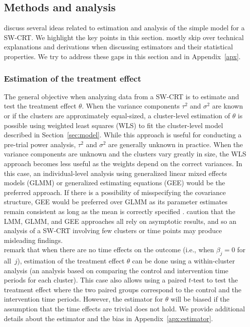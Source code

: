 \documentclass[10pt]{article}
\begin{document}
\subsection{Methods and analysis}

\textcite{Hussey:2007} discuss several ideas related to estimation and analysis of the simple model for a SW-CRT. We highlight the key points in this section. \citeauthor{Hussey:2007} mostly skip over technical explanations and derivations when discussing estimators and their statistical properties. We try to address these gaps in this section and in Appendix~\ref{apx}.

\subsubsection{Estimation of the treatment effect}

The general objective when analyzing data from a SW-CRT is to estimate and test the treatment effect $\theta$. When the variance components $\tau^2$ and $\sigma^2$ are known or if the clusters are approximately equal-sized, a cluster-level estimation of $\theta$ is possible using weighted least squares (WLS) to fit the cluster-level model described in Section~\ref{sec:model}. While this approach is useful for conducting a pre-trial power analysis, $\tau^2$ and $\sigma^2$ are generally unknown in practice. When the variance components are unknown and the clusters vary greatly in size, the WLS approach becomes less useful as the weights depend on the correct variances. In this case, an individual-level analysis using generalized linear mixed effects models (GLMM) or generalized estimating equations (GEE) would be the preferred approach. If there is a possibility of misspecifying the covariance structure, GEE would be preferred over GLMM as its parameter estimates remain consistent as long as the mean is correctly specified \parencite{Diggle:2002}. \textcite{Hussey:2007} caution that the LMM, GLMM, and GEE approaches all rely on asymptotic results, and so an analysis of a SW-CRT involving few clusters or time points may produce misleading findings.
\\

\citeauthor{Hussey:2007} remark that when there are no time effects on the outcome (i.e., when $\beta_j=0$ for all~$j$), estimation of the treatment effect $\theta$ can be done using a within-cluster analysis (an analysis based on comparing the control and intervention time periods for each cluster). This case also allows using a paired $t$-test to test the treatment effect where the two paired groups correspond to the control and the intervention time periods. However, the estimator for $\theta$ will be biased if the assumption that the time effects are trivial does not hold. We provide additional details about the estimator and the bias in Appendix~\ref{apx:estimator}.
\\
\end{document}
